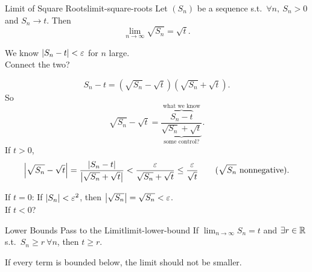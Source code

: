 \begin{theorem}{Limit of Square Roots}{limit-square-roots}
  Let $(S_n)$ be a sequence s.t.\ $\forall n,\ S_n>0$ and $S_n\to t$.
  Then
  \[
    \lim_{n\to\infty}\sqrt{S_n}=\sqrt{t}.
  \]
\end{theorem}

\begin{thinking}
  \begin{flushleft}
    We know $\left\lvert S_n-t \right\rvert<\varepsilon$ for $n$ large.\\
    Connect the two?
  \end{flushleft}
\end{thinking}
\begin{thinking}[Trick]
  \[
    S_n-t=(\sqrt{S_n}-\sqrt{t})(\sqrt{S_n}+\sqrt{t}).
  \]
  So
  \[
    \sqrt{S_n}-\sqrt{t}
    =\frac{\overbrace{S_n-t}^{\text{what we know}}}
    {\underbrace{\sqrt{S_n}+\sqrt{t}}_{\text{some control?}}}.
  \]
  If $t>0$,
  \[
    \left\lvert \sqrt{S_n}-\sqrt{t} \right\rvert
    =\frac{\left\lvert S_n-t \right\rvert}{\left\lvert \sqrt{S_n}+\sqrt{t} \right\rvert}
    <\frac{\varepsilon}{\sqrt{S_n}+\sqrt{t}}
    \le\frac{\varepsilon}{\sqrt{t}}
    \qquad(\sqrt{S_n}\text{ nonnegative}).
  \]
  \begin{flushleft}
    If $t=0$:
    If $\left\lvert S_n \right\rvert<\varepsilon^2$, then $\left\lvert \sqrt{S_n} \right\rvert=\sqrt{S_n}<\varepsilon$.\\
    If $t<0$?
  \end{flushleft}
\end{thinking}

\begin{lemma}{Lower Bounds Pass to the Limit}{limit-lower-bound}
  If $\lim_{n\to\infty}S_n=t$ and $\exists r\in\mathbb{R}$ s.t.\ $S_n\ge r\ \forall n$,
  then $t\ge r$.
\end{lemma}

If every term is bounded below, the limit should not be smaller.

